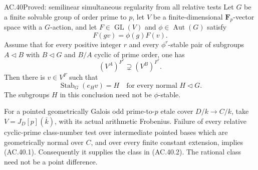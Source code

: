 \begin{claim}{AC.40}{Proved: semilinear simultaneous regularity from all relative tests}
Let \(G\) be a finite solvable group of order prime to \(p\),
let \(V\) be a finite-dimensional \(\mathbf F_p\)-vector space
with a \(G\)-action, and let \(F\in\operatorname{GL}(V)\) and
\(\phi\in\operatorname{Aut}(G)\) satisfy
\[
                         F(gv)=\phi(g)F(v).
\]
Assume that for every positive integer \(r\) and every
\(\phi^r\)-stable pair of subgroups \(A\triangleleft B\)
with \(B\triangleleft G\) and \(B/A\) cyclic of prime order, one has
\[
                  (V^A)^{F^r}\supsetneq(V^B)^{F^r}.
                  \tag{AC.40.1}
\]
Then there is \(v\in V^F\) such that
\[
                    \operatorname{Stab}_G(e_Hv)=H
                    \quad\text{for every normal }H\triangleleft G.
                    \tag{AC.40.2}
\]
The subgroups \(H\) in this conclusion need not be
\(\phi\)-stable.

For a pointed geometrically Galois odd prime-to-\(p\)
etale cover \(D/k\to C/k\), take
\(V=J_D[p](\overline k)\), with its actual arithmetic
Frobenius. Failure of every relative cyclic-prime
class-number test over intermediate pointed bases which are
geometrically normal over \(C\), and over every finite
constant extension, implies (AC.40.1).
Consequently it supplies the class in (AC.40.2).
The rational class need not be a point difference.
\end{claim}
